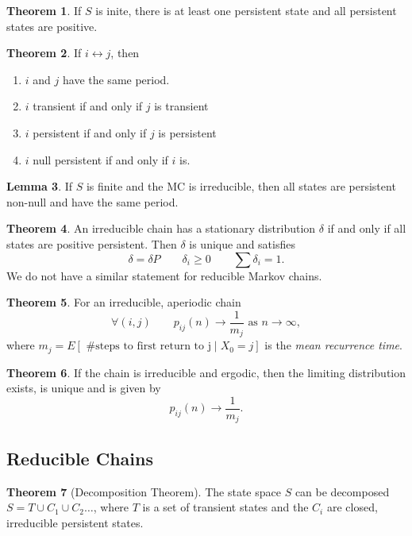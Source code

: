 \documentclass{article}
\theoremstyle{definition}
\newtheorem{theorem}{Theorem}[section]
\newtheorem{lemma}[theorem]{Lemma}
\begin{document}
\begin{theorem}
If $S$ is inite, there is at least one persistent state and all persistent states are positive.
\end{theorem}

\begin{theorem}
If $i \leftrightarrow j$, then
\begin{enumerate}
\item $i$ and $j$ have the same period.
\item $i$ transient if and only if $j$ is transient
\item $i$ persistent if and only if $j$ is persistent
\item $i$ null persistent if and only if $i$ is.
\end{enumerate}
\end{theorem}

\begin{lemma}
If $S$ is finite and the MC is irreducible, then all states are persistent non-null and have the same period.
\end{lemma}

\begin{theorem}
An irreducible chain has a stationary distribution $\delta$ if and only if all states are positive persistent. Then $\delta$ is unique and satisfies
$$
\delta = \delta P \qquad \delta_i \ge 0 \qquad \sum \delta_i = 1.
$$
We do not have a similar statement for reducible Markov chains.
\end{theorem}

\begin{theorem}
For an irreducible, aperiodic chain
$$
\forall (i,j) \qquad  p_{ij}(n) \to \frac{1}{m_j} \text{ as } n \to \infty,
$$
where $m_j = E \left[ \text{ \# steps to first return to j} \mid X_0 = j \right]$ is the \emph{mean recurrence time}.
\end{theorem}

\begin{theorem}
If the chain is irreducible and ergodic, then the limiting distribution exists, is unique and is given by
$$
p_{ij}(n) \to \frac{1}{m_j}.
$$
\end{theorem}

\subsection{Reducible Chains}

\begin{theorem}[Decomposition Theorem]
The state space $S$ can be decomposed $S = T \cup C_1 \cup C_2 \ldots$, where $T$ is a set of transient states and the $C_i$ are closed, irreducible persistent states.
\end{theorem}
\end{document}

